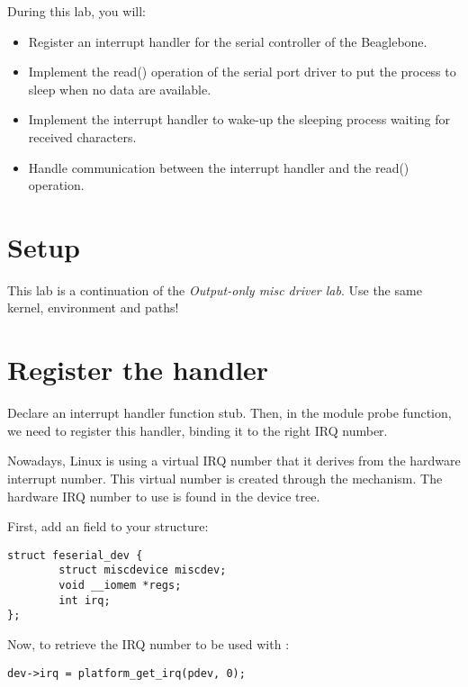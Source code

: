 
During this lab, you will:

\begin{itemize}
\item Register an interrupt handler for the serial controller of the
  Beaglebone.
\item Implement the read() operation of the serial port driver to put
  the process to sleep when no data are available.
\item Implement the interrupt handler to wake-up the sleeping process
  waiting for received characters.
\item Handle communication between the interrupt handler and the
  read() operation.
\end{itemize}

\section{Setup}

This lab is a continuation of the {\em Output-only misc driver
lab}. Use the same kernel, environment and paths!

\section{Register the handler}

Declare an interrupt handler function stub. Then, in the module probe
function, we need to register this handler, binding it to the right
IRQ number.

Nowadays, Linux is using a virtual IRQ number that it derives from the
hardware interrupt number. This virtual number is created through the
 mechanism. The hardware IRQ number to use is found in
the device tree.

First, add an  field to your  structure:

\begin{verbatim}
struct feserial_dev {
        struct miscdevice miscdev;
        void __iomem *regs;
        int irq;
};
\end{verbatim}

Now, to retrieve the IRQ number to be used with  :

\begin{verbatim}
dev->irq = platform_get_irq(pdev, 0);
\end{verbatim}

